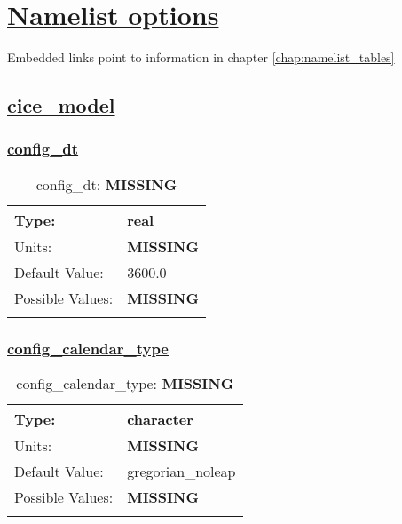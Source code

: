 \chapter[Namelist options]{\hyperref[chap:namelist_tables]{Namelist options}}
\label{chap:namelist_sections}
Embedded links point to information in chapter \ref{chap:namelist_tables}
\section[cice\_model]{\hyperref[sec:nm_tab_cice_model]{cice\_model}}
\label{sec:nm_sec_cice_model}
\subsection[config\_dt]{\hyperref[sec:nm_tab_cice_model]{config\_dt}}
\label{subsec:nm_sec_config_dt}
\begin{center}
\begin{longtable}{| p{2.0in} || p{4.0in} |}
    \hline
    Type: & real \\
    \hline
    Units: & {\bf \color{red} MISSING} \\
    \hline
    Default Value: & 3600.0 \\
    \hline
    Possible Values: & {\bf \color{red} MISSING} \\
    \hline
    \caption{config\_dt: {\bf \color{red} MISSING}}
\end{longtable}
\end{center}
\subsection[config\_calendar\_type]{\hyperref[sec:nm_tab_cice_model]{config\_calendar\_type}}
\label{subsec:nm_sec_config_calendar_type}
\begin{center}
\begin{longtable}{| p{2.0in} || p{4.0in} |}
    \hline
    Type: & character \\
    \hline
    Units: & {\bf \color{red} MISSING} \\
    \hline
    Default Value: & gregorian\_noleap \\
    \hline
    Possible Values: & {\bf \color{red} MISSING} \\
    \hline
    \caption{config\_calendar\_type: {\bf \color{red} MISSING}}
\end{longtable}
\end{center}
